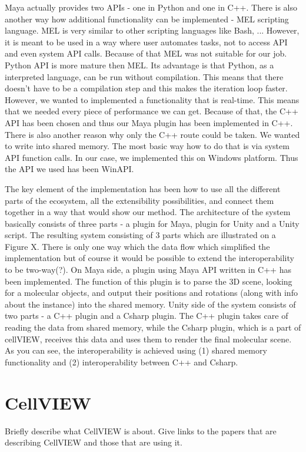 \documentclass[
  digital, %
  table,   %
  lof,     %
  lot,     %
]{fithesis3}
\begin{document}
{Maya actually provides two APIs - one in Python and one in C++. There is also another way how additional functionality can be implemented - MEL scripting language. MEL is very similar to other scripting languages like Bash, ... However, it is meant to be used in a way where user automates tasks, not to access API and even system API calls. Because of that MEL was not suitable for our job. Python API is more mature then MEL. Its advantage is that Python, as a interpreted language, can be run without compilation. This means that there doesn't have to be a compilation step and this makes the iteration loop faster. However, we wanted to implemented a functionality that is real-time. This means that we needed every piece of performance we can get. Because of that, the C++ API has been chosen and thus our Maya plugin has been implemented in C++.
There is also another reason why only the C++ route could be taken. We wanted to write into shared memory. The most basic way how to do that is via system API function calls. In our case, we implemented this on Windows platform. Thus the API we used has been WinAPI.


The key element of the implementation has been how to use all the different parts of the ecosystem, all the extensibility possibilities, and connect them together in a way that would show our method. The architecture of the system basically consists of three parts - a plugin for Maya, plugin for Unity and a Unity script.
The resulting system consisting of 3 parts which are illustrated on a Figure X. There is only one way which the data flow which simplified the implementation but of course it would be possible to extend the interoperability to be two-way(?).
On Maya side, a plugin using Maya API written in C++ has been implemented. The function of this plugin is to parse the 3D scene, looking for a molecular objects, and output their positions and rotations (along with info about the instance) into the shared memory.
Unity side of the system consists of two parts - a C++ plugin and a Csharp plugin. The C++ plugin takes care of reading the data from shared memory, while the Csharp plugin, which is a part of cellVIEW, receives this data and uses them to render the final molecular scene. As you can see, the interoperability is achieved using (1) shared memory functionality and (2) interoperability between C++ and Csharp.

\section{CellVIEW}
Briefly describe what CellVIEW is about. Give links to the papers that are describing CellVIEW and those that are using it.
}
\end{document}
